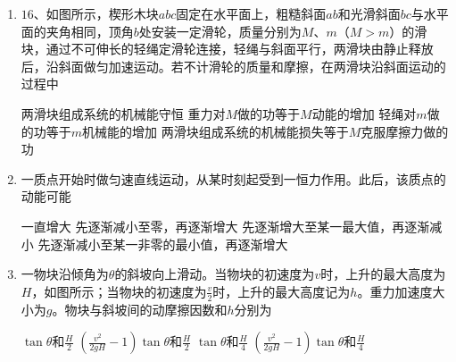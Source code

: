 \begin{enumerate}[leftmargin=0em]
\item 
{}
$ 16 $、如图所示，楔形木块$ abc $固定在水平面上，粗糙斜面$ ab $和光滑斜面$ bc $与水平面的夹角相同，顶角$ b $处安装一定滑轮，质量分别为$ M $、$ m $（$ M>m $）的滑块，通过不可伸长的轻绳定滑轮连接，轻绳与斜面平行，两滑块由静止释放后，沿斜面做匀加速运动。若不计滑轮的质量和摩擦，在两滑块沿斜面运动的过程中  


\begin{minipage}[h!]{0.7\linewidth}
\vspace{0.3em}
\fourchoices
{两滑块组成系统的机械能守恒}
{重力对$ M $做的功等于$ M $动能的增加}
{轻绳对$ m $做的功等于$ m $机械能的增加}
{两滑块组成系统的机械能损失等于$ M $克服摩擦力做的功}

\vspace{0.3em}
\end{minipage}
\hfill
\begin{minipage}[h!]{0.3\linewidth}
\flushright
\vspace{0.3em}

\vspace{0.3em}
\end{minipage}



\item
{}
一质点开始时做匀速直线运动，从某时刻起受到一恒力作用。此后，该质点的动能可能  

\fourchoices
{一直增大}
{先逐渐减小至零，再逐渐增大}
{先逐渐增大至某一最大值，再逐渐减小}
{先逐渐减小至某一非零的最小值，再逐渐增大}




\item 
{}
一物块沿倾角为$ \theta $的斜坡向上滑动。当物块的初速度为$ v $时，上升的最大高度为$ H $，如图所示；当物块的初速度为$ \frac{v}{2} $时，上升的最大高度记为$ h $。重力加速度大小为$ g $。物块与斜坡间的动摩擦因数和$ h $分别为  
\begin{figure}[h!]
\centering

\end{figure}

\fourchoices
{$ \tan \theta \text{和} \frac { H } { 2 } $}
{$ \left( \frac { v ^ { 2 } } { 2 g H } - 1 \right) \tan \theta \text{和} \frac { H } { 2 } $}
{$ \tan \theta \text{和} \frac { H } { 4 } $}
{$ \left( \frac { v ^ { 2 } } { 2 g H } - 1 \right) \tan \theta \text{和} \frac { H } { 4 } $}




\end{enumerate}
